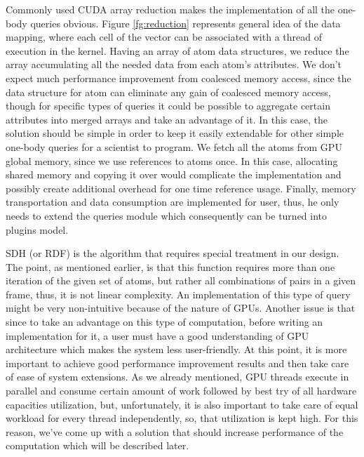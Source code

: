 \documentclass[12pt,letterpaper]{report}
\begin{document}
\noindent\hspace{3em}Commonly used CUDA array reduction\cite{gpureduction} makes the implementation of all the one-body queries obvious. Figure \ref{fg:reduction} represents general idea of the data mapping, where each cell of the vector can be associated with a thread of execution in the kernel. Having an array of atom data structures, we reduce the array accumulating all the needed data from each atom's attributes. We don't expect much performance improvement from coalesced memory access, since the data structure for atom can eliminate any gain of coalesced memory access, though for specific types of queries it could be possible to aggregate certain attributes into merged arrays and take an advantage of it. In this case, the solution should be simple in order to keep it easily extendable for other simple one-body queries for a scientist to program. We fetch all the atoms from GPU global memory, since we use references to atoms once. In this case, allocating shared memory and copying it over would complicate the implementation and possibly create additional overhead for one time reference usage. Finally, memory transportation and data consumption are implemented for user, thus, he only needs to extend the queries module which consequently can be turned into plugins model.

\noindent\hspace{3em}SDH (or RDF) is the algorithm that requires special treatment in our design. The point, as mentioned earlier, is that this function requires more than one iteration of the given set of atoms, but rather all combinations of pairs in a given frame, thus, it is not linear complexity. An implementation of this type of query might be very non-intuitive because of the nature of GPUs. Another issue is that since to take an advantage on this type of computation, before writing an implementation for it, a user must have a good understanding of GPU architecture which makes the system less user-friendly. At this point, it is more important to achieve good performance improvement results and then take care of ease of system extensions. As we already mentioned, GPU threads execute in parallel and consume certain amount of work followed by best try of all hardware capacities utilization, but, unfortunately, it is also important to take care of equal workload for every thread independently, so, that utilization is kept high. For this reason, we've come up with a solution that should increase performance of the computation which will be described later.
\end{document}
